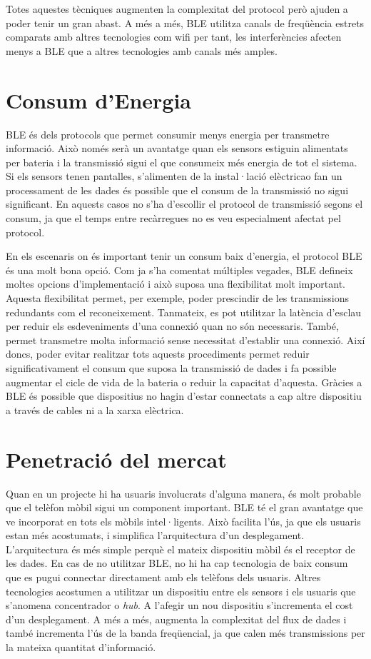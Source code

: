 Totes aquestes tècniques augmenten la complexitat del protocol però ajuden a poder tenir un gran abast.
A més a més, BLE utilitza canals de freqüència estrets comparats amb altres tecnologies com wifi per tant, les interferències afecten menys a BLE que a altres tecnologies amb canals més amples.

\section*{Consum d'Energia}

BLE és dels protocols que permet consumir menys energia per transmetre informació.
Això només serà un avantatge quan els sensors estiguin alimentats per bateria i la transmissió sigui el que consumeix més energia de tot el sistema.
Si els sensors tenen pantalles, s'alimenten de la instal·lació elèctricao fan un processament de les dades és possible que el consum de la transmissió no sigui significant.
En aquests casos no s'ha d'escollir el protocol de transmissió segons el consum, ja que el temps entre recàrregues no es veu especialment afectat pel protocol.

En els escenaris on és important tenir un consum baix d'energia, el protocol BLE és una molt bona opció.
Com ja s'ha comentat múltiples vegades, BLE defineix moltes opcions d'implementació i això suposa una flexibilitat molt important.
Aquesta flexibilitat permet, per exemple, poder prescindir de les transmissions redundants com el reconeixement.
Tanmateix, es pot utilitzar la latència d'esclau per reduir els esdeveniments d'una connexió quan no són necessaris.
També, permet transmetre molta informació sense necessitat d'establir una connexió.
Així doncs, poder evitar realitzar tots aquests procediments permet reduir significativament el consum que suposa la transmissió de dades i fa possible augmentar el cicle de vida de la bateria o reduir la capacitat d'aquesta.
Gràcies a BLE és possible que dispositius no hagin d'estar connectats a cap altre dispositiu a través de cables ni a la xarxa elèctrica.

\section*{Penetració del mercat}

Quan en un projecte hi ha usuaris involucrats d'alguna manera, és molt probable que el telèfon mòbil sigui un component important.
BLE té el gran avantatge que ve incorporat en tots els mòbils intel·ligents.
Això facilita l'ús, ja que els usuaris estan més acostumats, i simplifica l'arquitectura d'un desplegament.
L'arquitectura és més simple perquè el mateix dispositiu mòbil és el receptor de les dades.
En cas de no utilitzar BLE, no hi ha cap tecnologia de baix consum que es pugui connectar directament amb els telèfons dels usuaris.
Altres tecnologies acostumen a utilitzar un dispositiu entre els sensors i els usuaris que s'anomena concentrador o \textit{hub}.
A l'afegir un nou dispositiu s'incrementa el cost d'un desplegament.
A més a més, augmenta la complexitat del flux de dades i també incrementa l'ús de la banda freqüencial, ja que calen més transmissions per la mateixa quantitat d'informació.

